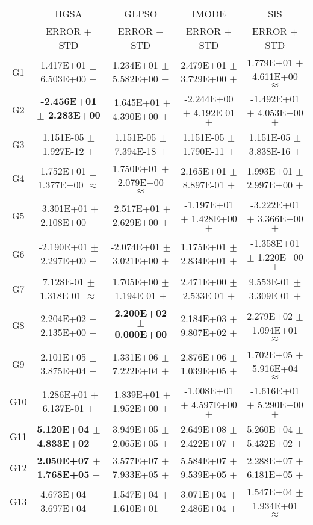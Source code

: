 \documentclass[paper]{ieice}
\begin{document}
\begin{table*}[htbp]
\begin{tabular}{c|c|c|c|c}
		&	HGSA				&	GLPSO				&	IMODE				&	SIS				\\   \cline{2-5}
		&	ERROR	$\pm$	STD		&	ERROR	$\pm$	STD		&	ERROR	$\pm$	STD		&	ERROR	$\pm$	STD		\\ \hline
		G1	&	1.417E+01	$\pm$	6.503E+00	$-$	&	1.234E+01	$\pm$	5.582E+00	$-$	&	2.479E+01	$\pm$	3.729E+00	$+$	&	1.779E+01	$\pm$	4.611E+00	$\approx$	\\
		G2	&	\textbf{-2.456E+01	$\pm$	2.283E+00}	$-$	&	-1.645E+01	$\pm$	4.390E+00	$+$	&	-2.244E+00	$\pm$	4.192E-01	$+$	&	-1.492E+01	$\pm$	4.053E+00	$+$	\\
		G3	&	1.151E-05	$\pm$	1.927E-12	$+$	&	1.151E-05	$\pm$	7.394E-18	$+$	&	1.151E-05	$\pm$	1.790E-11	$+$	&	1.151E-05	$\pm$	3.838E-16	$+$	\\
		G4	&	1.752E+01	$\pm$	1.377E+00	$\approx$	&	1.750E+01	$\pm$	2.079E+00	$\approx$	&	2.165E+01	$\pm$	8.897E-01	$+$	&	1.993E+01	$\pm$	2.997E+00	$+$	\\
		G5	&	-3.301E+01	$\pm$	2.108E+00	$+$	&	-2.517E+01	$\pm$	2.629E+00	$+$	&	-1.197E+01	$\pm$	1.428E+00	$+$	&	-3.222E+01	$\pm$	3.366E+00	$+$	\\
		G6	&	-2.190E+01	$\pm$	2.297E+00	$+$	&	-2.074E+01	$\pm$	3.021E+00	$+$	&	1.175E+01	$\pm$	2.834E+01	$+$	&	-1.358E+01	$\pm$	1.220E+00	$+$	\\
		G7	&	7.128E-01	$\pm$	1.318E-01	$\approx$	&	1.705E+00	$\pm$	1.194E-01	$+$	&	2.471E+00	$\pm$	2.533E-01	$+$	&	9.553E-01	$\pm$	3.309E-01	$+$	\\
		G8	&	2.204E+02	$\pm$	2.135E+00	$-$	&	\textbf{2.200E+02	$\pm$	0.000E+00}	$-$	&	2.184E+03	$\pm$	9.807E+02	$+$	&	2.279E+02	$\pm$	1.094E+01	$\approx$	\\
		G9	&	2.101E+05	$\pm$	3.875E+04	$+$	&	1.331E+06	$\pm$	7.222E+04	$+$	&	2.876E+06	$\pm$	1.039E+05	$+$	&	1.702E+05	$\pm$	5.916E+04	$\approx$	\\
		G10	&	-1.286E+01	$\pm$	6.137E-01	$+$	&	-1.839E+01	$\pm$	1.952E+00	$+$	&	-1.008E+01	$\pm$	4.597E+00	$+$	&	-1.616E+01	$\pm$	5.290E+00	$+$	\\
		G11	&	\textbf{5.120E+04	$\pm$	4.833E+02}	$-$	&	3.949E+05	$\pm$	2.065E+05	$+$	&	2.649E+08	$\pm$	2.422E+07	$+$	&	5.260E+04	$\pm$	5.432E+02	$+$	\\
		G12	&	\textbf{2.050E+07	$\pm$	1.768E+05}	$-$	&	3.577E+07	$\pm$	7.933E+05	$+$	&	5.584E+07	$\pm$	9.539E+05	$+$	&	2.288E+07	$\pm$	6.181E+05	$+$	\\
		G13	&	4.673E+04	$\pm$	3.697E+04	$+$	&	1.547E+04	$\pm$	1.610E+01	$-$	&	3.071E+04	$\pm$	2.486E+04	$+$	&	1.547E+04	$\pm$	1.934E+01	$\approx$	\\

\end{tabular}
\end{table*}
\end{document}
